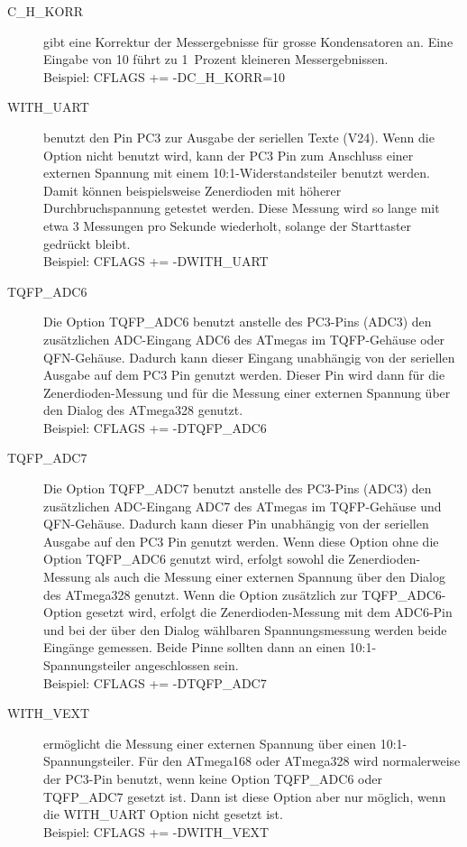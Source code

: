 \begin{description}
  \item[C\_H\_KORR] gibt eine Korrektur der Messergebnisse für grosse Kondensatoren an.
Eine Eingabe von 10 führt zu 1~Prozent kleineren Messergebnissen.\\
Beispiel: CFLAGS += -DC\_H\_KORR=10

  \item[WITH\_UART] benutzt den Pin PC3 zur Ausgabe der seriellen Texte (V24). Wenn die Option nicht
benutzt wird, kann der PC3 Pin zum Anschluss einer externen Spannung mit einem 10:1-Widerstandsteiler benutzt
werden. Damit können beispielsweise Zenerdioden mit höherer Durchbruchspannung getestet werden.
Diese Messung wird so lange mit etwa 3 Messungen pro Sekunde wiederholt, solange der Starttaster gedrückt bleibt.\\
Beispiel: CFLAGS += -DWITH\_UART

  \item[TQFP\_ADC6] Die Option TQFP\_ADC6 benutzt anstelle des PC3-Pins (ADC3) den zusätzlichen ADC-Eingang ADC6
des ATmegas im TQFP-Gehäuse oder QFN-Gehäuse.
Dadurch kann dieser Eingang unabhängig von der seriellen Ausgabe auf dem PC3 Pin genutzt werden. Dieser Pin wird
dann für die Zenerdioden-Messung und für die Messung einer externen Spannung über den Dialog des ATmega328 genutzt.\\
Beispiel: CFLAGS += -DTQFP\_ADC6

  \item[TQFP\_ADC7] Die Option TQFP\_ADC7 benutzt anstelle des PC3-Pins (ADC3) den zusätzlichen ADC-Eingang ADC7
des ATmegas im TQFP-Gehäuse und QFN-Gehäuse.
Dadurch kann dieser Pin unabhängig von der seriellen Ausgabe auf den PC3 Pin genutzt werden. Wenn diese Option 
ohne die Option TQFP\_ADC6 genutzt wird, erfolgt sowohl die Zenerdioden-Messung als auch die Messung einer externen
Spannung über den Dialog des ATmega328 genutzt. Wenn die Option zusätzlich zur TQFP\_ADC6-Option gesetzt wird,
erfolgt die Zenerdioden-Messung mit dem ADC6-Pin und bei der über den Dialog wählbaren Spannungsmessung werden
beide Eingänge gemessen. Beide Pinne sollten dann an einen 10:1-Spannungsteiler angeschlossen sein.\\
Beispiel: CFLAGS += -DTQFP\_ADC7

  \item[WITH\_VEXT] ermöglicht die Messung einer externen Spannung über einen 10:1-Spannungsteiler.
Für den ATmega168 oder ATmega328 wird normalerweise der PC3-Pin benutzt, wenn keine Option TQFP\_ADC6 oder
TQFP\_ADC7 gesetzt ist. Dann ist diese Option aber nur möglich, wenn die WITH\_UART Option nicht gesetzt ist.\\
Beispiel: CFLAGS += -DWITH\_VEXT 


\end{description}
